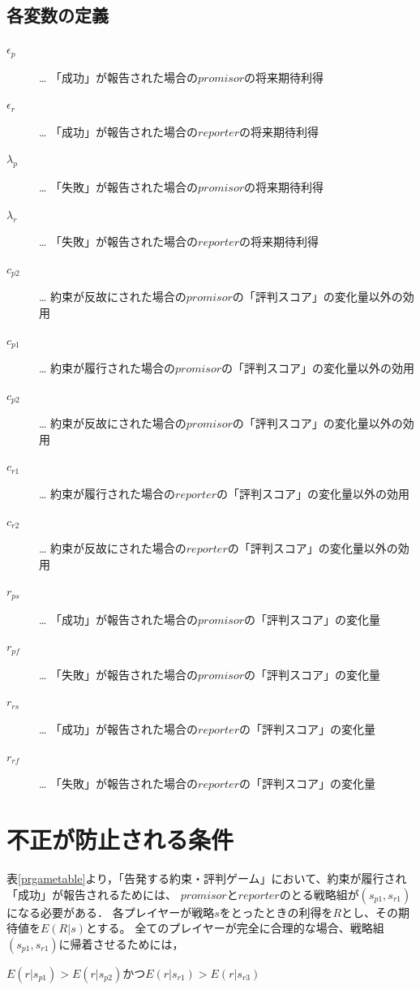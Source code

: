 \subsection{各変数の定義}
\begin{description}
  \item[$\epsilon_p$]… 「成功」が報告された場合の$promisor$の将来期待利得
  \item[$\epsilon_r$]… 「成功」が報告された場合の$reporter$の将来期待利得
  \item[$\lambda_p$]… 「失敗」が報告された場合の$promisor$の将来期待利得
  \item[$\lambda_r$]… 「失敗」が報告された場合の$reporter$の将来期待利得
  \item[$c_{p2}$]… 約束が反故にされた場合の$promisor$の「評判スコア」の変化量以外の効用
  \item[$c_{p1}$]… 約束が履行された場合の$promisor$の「評判スコア」の変化量以外の効用
  \item[$c_{p2}$]… 約束が反故にされた場合の$promisor$の「評判スコア」の変化量以外の効用
  \item[$c_{r1}$]… 約束が履行された場合の$reporter$の「評判スコア」の変化量以外の効用
  \item[$c_{r2}$]… 約束が反故にされた場合の$reporter$の「評判スコア」の変化量以外の効用
  \item[$r_{ps}$]… 「成功」が報告された場合の$promisor$の「評判スコア」の変化量
  \item[$r_{pf}$]… 「失敗」が報告された場合の$promisor$の「評判スコア」の変化量
  \item[$r_{rs}$]… 「成功」が報告された場合の$reporter$の「評判スコア」の変化量
  \item[$r_{rf}$]… 「失敗」が報告された場合の$reporter$の「評判スコア」の変化量
\end{description}

\section{不正が防止される条件}
表\ref{prgametable}より，「告発する約束・評判ゲーム」において、約束が履行され「成功」が報告されるためには、
$promisor$と$reporter$のとる戦略組が$ (s_{p1}, s_{r1})$になる必要がある．
各プレイヤーが戦略$s$をとったときの利得を$R$とし、その期待値を$E(R|s)$とする。
全てのプレイヤーが完全に合理的な場合、戦略組$(s_{p1}, s_{r1})$に帰着させるためには，

\begin{description}
  \centering
  \item[条件③] $E(r|s_{p1}) > E(r|s_{p2})$かつ$E(r|s_{r1}) > E(r|s_{r3})$
\end{description}

